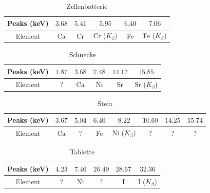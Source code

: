 \documentclass[a4paper,14pt]{article}
\begin{document}
\begin{table}[H]
	\renewcommand{\arraystretch}{1}
	\centering
	\Large
	\begin{adjustbox}{width=\textwidth}
		\begin{tabular}{|c|c|c|c|c|c|}
			\hline
			Peaks (keV) & $3.68$ & $5.41$ & $5.95$ & $6.40$ & $7.06$ \\
			\hline
			Element & Ca & Cr & Cr ($K_\beta$) & Fe  & Fe ($K_\beta$) \\
			\hline
		\end{tabular}
	\end{adjustbox}
	\caption{ Zellenbatterie }
	\label{tab: }
\end{table}
\begin{table}[H]
	\renewcommand{\arraystretch}{1}
	\centering
	\Large
	\begin{adjustbox}{width=\textwidth}
		\begin{tabular}{|c|c|c|c|c|c|}
			\hline
			Peaks (keV) & $1.87$ & $3.68$ & $7.48$ & $14.17$ & $15.85$ \\
			\hline
			Element & ? & Ca & Ni & Sr & Sr ($K_\beta$) \\
			\hline
		\end{tabular}
	\end{adjustbox}
	\caption{ Schnecke }
	\label{tab: }
\end{table}
\begin{table}[H]
	\renewcommand{\arraystretch}{1}
	\centering
	\Large
	\begin{adjustbox}{width=\textwidth}
		\begin{tabular}{|c|c|c|c|c|c|c|c|}
			\hline
			Peaks (keV) & $3.67$ & $5.04$ & $6.40$ & $8.22$ & $10.60$ & $14.25$ & $15.74$ \\
			\hline
			Element & Ca & ? & Fe & Ni ($K_\beta$) & ? & ? & ? \\
			\hline
		\end{tabular}
	\end{adjustbox}
	\caption{ Stein }
	\label{tab: }
\end{table}
\begin{table}[H]
	\renewcommand{\arraystretch}{1}
	\centering
	\Large
	\begin{adjustbox}{width=\textwidth}
		\begin{tabular}{|c|c|c|c|c|c|}
			\hline
			Peaks (keV) & $4.23$ & $7.46$ & $26.49$ & $28.67$ & $32.36$ \\
			\hline
			Element & ? & Ni & ? & I & I ($K_\beta$) \\
			\hline
		\end{tabular}
	\end{adjustbox}
	\caption{ Tablette }
	\label{tab: }
\end{table}
\end{document}
